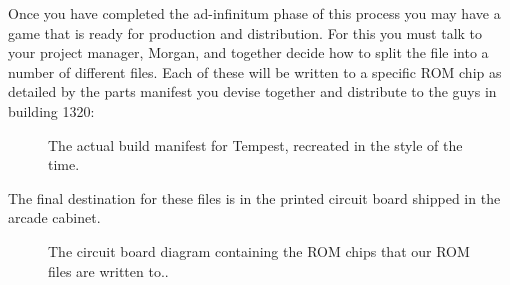 Once you have completed the ad-infinitum phase of this process you may have a game that is ready
for production and distribution. For this you must talk to your project manager, Morgan, and together
decide how to split the  file into a number of different files. Each of these will
be written to a specific ROM chip as detailed by the parts manifest you devise together and distribute to
the guys in building 1320:
\begin{figure}[H]
			\centering
		\caption{The actual build manifest for Tempest, recreated in the style of the time.}
\end{figure}
The final destination for these files is in the printed circuit board shipped in the arcade cabinet.
\begin{figure}[H]
			\centering
		\caption{The circuit board diagram containing the ROM chips that our ROM files are written to..}
\end{figure}


